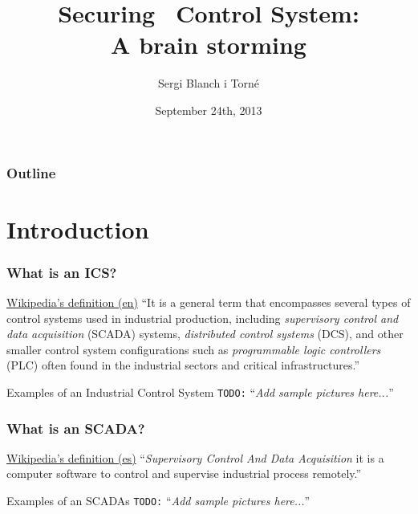 \documentclass{beamer}
\title[Securing \tango\, Control System]{Securing \tango\, Control System:\\ A brain storming}
\author[Sergi Blanch-Torn\'e]{Sergi Blanch i Torn\'e}
\institute[Universidad de Lleida]{Cryptography \& Graphs\\Math Department\\ Universitat de Lleida}
\date{September 24th, 2013}
\newcommand{\todo}[1]{\texttt{\color{red}TODO:} ``\emph{#1}''}
\begin{document}
\begin{frame}
  \titlepage
\end{frame}

\begin{frame}
\frametitle{Outline}
\tableofcontents[hideallsubsections]
\end{frame}

\section{Introduction}

\begin{frame}
\frametitle{What is an ICS?}
    \begin{block}{\href{http://en.wikipedia.org/wiki/Industrial_Control_System}{Wikipedia's definition (en)}}
        ``It is a general term that encompasses several types of control systems used in industrial production, including \emph{supervisory control and data acquisition} (SCADA) systems, \emph{distributed control systems} (DCS), and other smaller control system configurations such as \emph{programmable logic controllers} (PLC) often found in the industrial sectors and critical infrastructures.''
    \end{block}
    \begin{exampleblock}{Examples of an Industrial Control System}
        \todo{Add sample pictures here...}
    \end{exampleblock}
\end{frame}

\begin{frame}
\frametitle{What is an SCADA?}
    \begin{block}{\href{http://es.wikipedia.org/wiki/SCADA}{Wikipedia's definition (es)}}
        ``\emph{Supervisory Control And Data Acquisition} it is a computer software to control and supervise industrial process remotely.''
    \end{block}
    \begin{exampleblock}{Examples of an SCADAs}
        \todo{Add sample pictures here...}
    \end{exampleblock}
\end{frame}
\end{document}
